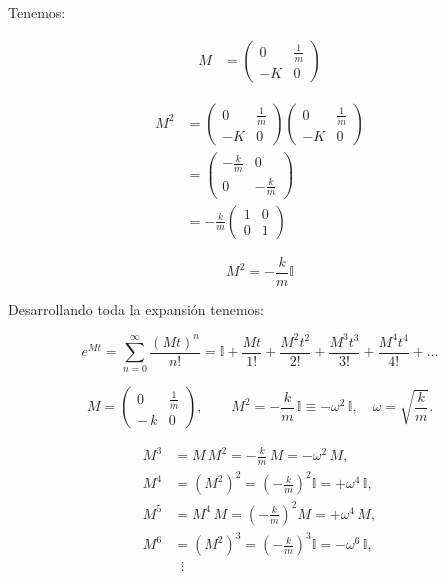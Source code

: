 \documentclass{article}
\begin{document}
Tenemos:



\begin{equation}
\begin{split}
M &= \left(   \begin{array}{cc}
0 & \frac{1}{m}\\
-K & 0
\end{array} \right) 
\end{split}
\end{equation}

\begin{equation}
\begin{split}
M^{2}&= \left(   \begin{array}{cc}
0 & \frac{1}{m}\\
-K & 0
\end{array} \right) \left(   \begin{array}{cc}
0 & \frac{1}{m}\\
-K & 0
\end{array} \right) \\
&= \left(   \begin{array}{cc}
- \frac{k}{m} & 0\\
0 & -\frac{k}{m}
\end{array} \right) \\
&= - \frac{k}{m}\left(   \begin{array}{cc}
1 & 0\\
0 & 1
\end{array} \right) 
\end{split}
\end{equation}


\[ M^{2} = - \frac{k}{m} \mathbb{I} \]

Desarrollando toda la expansión tenemos:

\[ e^{Mt} = \sum\limits_{n=0}^{\infty} \frac{(Mt)^{n} }{n!} = \mathbb{I} + \frac{Mt}{1!} + \frac{M^{2}t^{2}}{2!} + \frac{ M^{3}t^{3} }{3!} + \frac{M^{4}t^{4}}{4!} + \ldots \]


\[
M=\begin{pmatrix}
0 & \tfrac{1}{m}\\[2pt]
-\,k & 0
\end{pmatrix},\qquad
M^2=-\frac{k}{m}\,\mathbb{I}\equiv -\omega^2\,\mathbb{I},\quad
\omega=\sqrt{\frac{k}{m}}.
\]

\[
\begin{aligned}
M^3&=M\,M^2=-\frac{k}{m}\,M=-\omega^2\,M,\\
M^4&=(M^2)^2=\left(-\frac{k}{m}\right)^{\!2}\mathbb{I}=+\omega^4\,\mathbb{I},\\
M^5&=M^4\,M=\left(-\frac{k}{m}\right)^{\!2}M=+\omega^4\,M,\\
M^6&=(M^2)^3=\left(-\frac{k}{m}\right)^{\!3}\mathbb{I}=-\omega^6\,\mathbb{I},\\
&\;\;\vdots
\end{aligned}
\]
\end{document}

